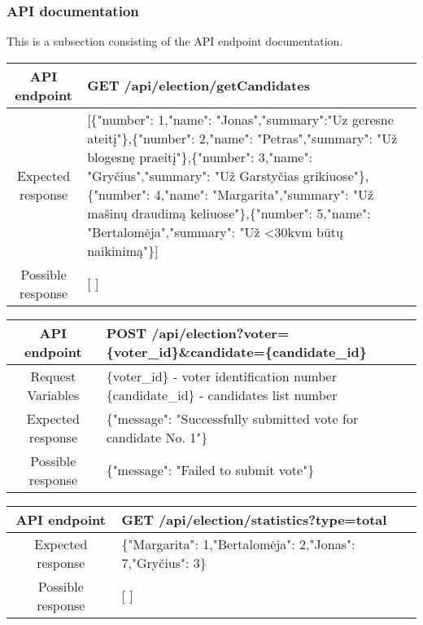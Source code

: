 \documentclass[12pt,a4paper]{article}
\begin{document}
\subsubsection{API documentation}
This is a subsection consisting of the API endpoint documentation.
\begin{center}
\begin{tabular}{ |c|m{30em}| }
 \hline
 API endpoint & GET /api/election/getCandidates \\ \hline
 Expected response & [\newline \{"number": 1,"name": "Jonas","summary":"Uz geresne ateitį"\},\newline\{"number": 2,"name": "Petras","summary": "Už blogesnę praeitį"\},\newline\{"number": 3,"name": "Gryčius","summary": "Už Garstyčias grikiuose"\},\newline\{"number": 4,"name": "Margarita","summary": "Už mašinų draudimą keliuose"\},\newline\{"number": 5,"name": "Bertalomėja","summary": "Už <30kvm būtų naikinimą"\}\newline] \\ \hline
 Possible response & [ ]\\
 \hline
\end{tabular}
\end{center}

\begin{center}
\begin{tabular}{ |c|m{30em}| }
 \hline
API endpoint & POST /api/election?voter=\{voter\_id\}\&candidate=\{candidate\_id\}  \\ \hline
 Request Variables & \{voter\_id\} - voter identification number
 \{candidate\_id\} - candidates list number \\ \hline
 Expected response & \{"message": "Successfully submitted vote for candidate No. 1"\} \\ \hline
 Possible response & \{"message": "Failed to submit vote"\} \\ \hline
\end{tabular}
\end{center}

\begin{center}
\begin{tabular}{ |c|m{30em}| }
 \hline
 API endpoint & GET /api/election/statistics?type=total \\ \hline
 Expected response & \{"Margarita": 1,"Bertalomėja": 2,"Jonas": 7,"Gryčius": 3\} \\ \hline
 Possible response & [ ] \\ \hline
\end{tabular}
\end{center}
\end{document}
